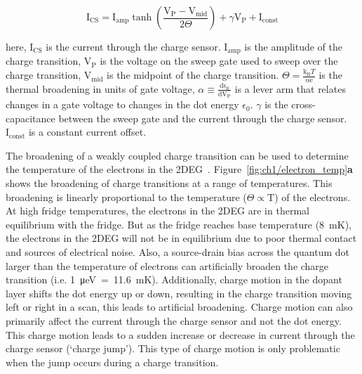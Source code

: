 \begin{equation}\label{eq:cs_lineshape}
 \mathrm{I_{CS}} = 
 \mathrm{I_{amp}}
 \tanh
 \left( 
 \frac{\mathrm{V_P - V_{mid}}}{2\Theta}
 \right) + 
 \gamma \mathrm{V_P}
 + \mathrm{I_{const}}
\end{equation}

\noindent here, $\mathrm{I_{CS}}$ is the current through the charge sensor. $\mathrm{I_{amp}}$ is the amplitude of the charge transition, $\mathrm{V_{P}}$ is the voltage on the sweep gate used to sweep over the charge transition, $\mathrm{V_{mid}}$ is the midpoint of the charge transition. $\Theta=\frac{\mathrm{k_B}T}{\mathrm{\alpha e}}$ is the thermal broadening in units of gate voltage, $\alpha \equiv \frac{\mathrm{d\epsilon_0}}{\mathrm{dV_P}}$ is a lever arm that relates changes in a gate voltage to changes in the dot energy $\epsilon_0$. $\gamma$ is the cross-capacitance between the sweep gate and the current through the charge sensor. $\mathrm{I_{const}}$ is a constant current offset.



The broadening of a weakly coupled charge transition can be used to determine the temperature of the electrons in the 2DEG~\cite{cs_measure_temp}. Figure~\ref{fig:ch1/electron_temp}\textbf{a} shows the broadening of charge transitions at a range of temperatures. This broadening is linearly proportional to the temperature ($\Theta\propto\mathrm{T}$) of the electrons. At high fridge temperatures, the electrons in the 2DEG are in thermal equilibrium with the fridge. But as the fridge reaches base temperature (\qty{8}{mK}), the electrons in the 2DEG will not be in equilibrium due to poor thermal contact and sources of electrical noise. Also, a source-drain bias across the quantum dot larger than the temperature of electrons can artificially broaden the charge transition (i.e. \qty{1}{\micro eV}~=~\qty{11.6}{mK}). Additionally, charge motion in the dopant layer shifts the dot energy up or down, resulting in the charge transition moving left or right in a scan, this leads to artificial broadening. Charge motion can also primarily affect the current through the charge sensor and not the dot energy. This charge motion leads to a sudden increase or decrease in current through the charge sensor (`charge jump'). This type of charge motion is only problematic when the jump occurs during a charge transition.


